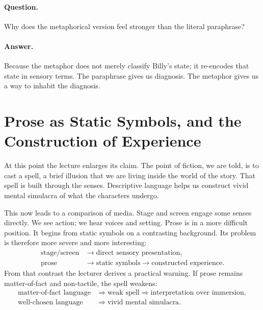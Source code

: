 \paragraph{Question.} Why does the metaphorical version feel stronger than the literal paraphrase?

\paragraph{Answer.} Because the metaphor does not merely classify Billy's state; it re-encodes that state in sensory terms. The paraphrase gives us diagnosis. The metaphor gives us a way to inhabit the diagnosis.

\section{Prose as Static Symbols, and the Construction of Experience}

At this point the lecture enlarges its claim. The point of fiction, we are told, is to cast a spell, a brief illusion that we are living inside the world of the story. That spell is built through the senses. Descriptive language helps us construct vivid mental simulacra of what the characters undergo.

This now leads to a comparison of media. Stage and screen engage some senses directly. We see action; we hear voices and setting. Prose is in a more difficult position. It begins from static symbols on a contrasting background. Its problem is therefore more severe and more interesting:
\begin{align}
\text{stage/screen} &\to \text{direct sensory presentation},\\
\text{prose} &\to \text{static symbols} \to \text{constructed experience}.
\end{align}
From that contrast the lecturer derives a practical warning. If prose remains matter-of-fact and non-tactile, the spell weakens:
\begin{align}
\text{matter-of-fact language} &\Rightarrow \text{weak spell} \Rightarrow \text{interpretation over immersion},\\
\text{well-chosen language} &\Rightarrow \text{vivid mental simulacra}.
\end{align}

\begin{figure}[h]
\centering
{}
\end{figure}

